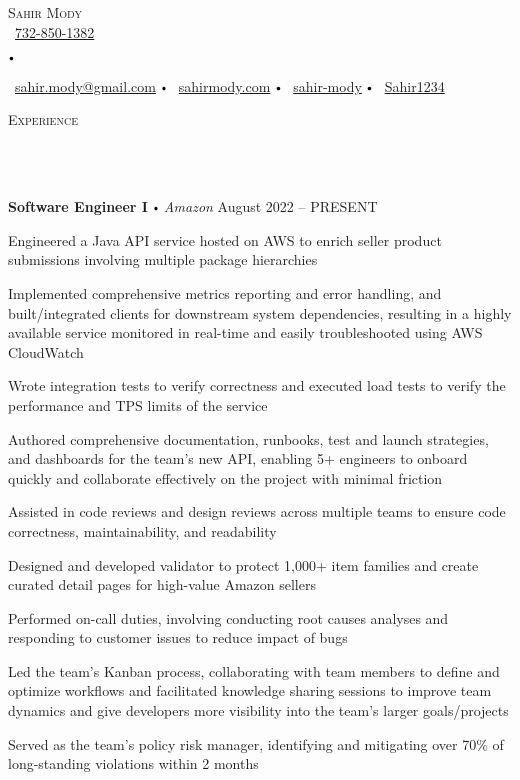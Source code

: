 \documentclass{article}
\newcommand{\contact}[3]{
\vspace*{3pt}
\begin{center}
{\Huge \scshape {#1}}\\
\vspace{0pt}
#2 
\vspace{0pt}
#3
\end{center}
\vspace*{-3pt}
}
\newcommand{\header}[1]{{
\hspace*{-15pt}\vspace*{10pt} \large \scshape{#1}} \vspace*{-6pt} 
\lineunder
}
\newcommand{\lineunder}{
\vspace*{-8pt} \\ \hspace*{-18pt} 
\hrulefill \\
}
\newcommand{\employer}[4]{
\textbf{#1} \labelitemi \textit{#2} \hfill #3 \\ #4 \vspace*{3pt}
}
\renewcommand{\labelitemi}{
$\vcenter{\hbox{\tiny$\bullet$}}$\hspace*{3pt}
}
\renewcommand{\labelitemii}{
$\vcenter{\hbox{\tiny$\bullet$}}$\hspace*{-3pt}
}
\newenvironment{bullet-list-minor}{
\begin{list}{\labelitemii}{\setlength\leftmargin{15pt} 
\topsep 0pt \itemsep 1pt}}{\vspace*{4pt}\end{list}
}
\begin{document}
\small
\vspace*{-64pt}

\contact{Sahir Mody}\bigskip
{\faPhone\
\href{tel:7328501382}{732-850-1382}
\labelitemi
\faEnvelope\  \href{mailto:sahir.modyatgmail.com}{sahir.mody@gmail.com} \labelitemi \faInfoCircle\  \href{https://sahirmody.com}{sahirmody.com} \labelitemi \faLinkedinSquare\  \href{https://www.linkedin.com/in/sahir-mody}{sahir-mody}  \labelitemi \faGithub\  \href{https://www.github.com/Sahir1234}{Sahir1234}}

\bigskip
\smallskip

\header{Experience}
    \vspace{4pt}
    \employer{Software Engineer I}{Amazon}{August 2022 -- PRESENT}{}
	\begin{bullet-list-minor}
        \item Engineered a Java API service hosted on AWS to enrich seller product submissions involving multiple package hierarchies
        \item Implemented comprehensive metrics reporting and error handling, and built/integrated clients for downstream system dependencies, resulting in a highly available service monitored in real-time and easily troubleshooted using AWS CloudWatch
        \item Wrote integration tests to verify correctness and executed load tests to verify the performance and TPS limits of the service
        \item Authored comprehensive documentation, runbooks, test and launch strategies, and dashboards for the team's new API, enabling 5+ engineers to onboard quickly and collaborate effectively on the project with minimal friction
        \item Assisted in code reviews and design reviews across multiple teams to ensure code correctness, maintainability, and readability
        \item Designed and developed validator to protect 1,000+ item families and create curated detail pages for high-value Amazon sellers
        \item Performed on-call duties, involving conducting root causes analyses and responding to customer issues to reduce impact of bugs
        \item Led the team's Kanban process, collaborating with team members to define and optimize workflows and facilitated knowledge sharing sessions to improve team dynamics and give developers more visibility into the team's larger goals/projects
        \item Served as the team's policy risk manager, identifying and mitigating over 70\% of long-standing violations within 2 months
    \end{bullet-list-minor}
    \medskip
    
\end{document}
